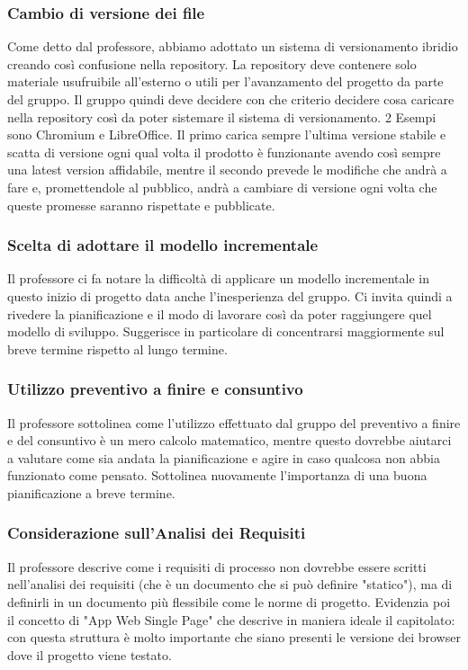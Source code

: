 \subsubsection{Cambio di versione dei file}
Come detto dal professore, abbiamo adottato un sistema di versionamento ibridio creando così confusione nella repository. La repository deve contenere solo materiale usufruibile all'esterno o utili per l'avanzamento del progetto da parte del gruppo. Il gruppo quindi deve decidere con che criterio decidere cosa caricare nella repository così da poter sistemare il sistema di versionamento.
2 Esempi sono Chromium e LibreOffice. Il primo carica sempre l'ultima versione stabile e scatta di versione ogni qual volta il prodotto è funzionante avendo così sempre una latest version affidabile, mentre il secondo prevede le modifiche che andrà a fare e, promettendole al pubblico, andrà a cambiare di versione ogni volta che queste promesse saranno rispettate e pubblicate.

\subsubsection{Scelta di adottare il modello incrementale}
Il professore ci fa notare la difficoltà di applicare un modello incrementale in questo inizio di progetto data anche l'inesperienza del gruppo. Ci invita quindi a rivedere la pianificazione e il modo di lavorare così da poter raggiungere quel modello di sviluppo. Suggerisce in particolare di concentrarsi maggiormente sul breve termine rispetto al lungo termine.

\subsubsection{Utilizzo preventivo a finire e consuntivo}
Il professore sottolinea come l'utilizzo effettuato dal gruppo del preventivo a finire e del consuntivo è un mero calcolo matematico, mentre questo dovrebbe aiutarci a valutare come sia andata la pianificazione e agire in caso qualcosa non abbia funzionato come pensato. Sottolinea nuovamente l'importanza di una buona pianificazione a breve termine.

\subsubsection{Considerazione sull'Analisi dei Requisiti}
Il professore descrive come i requisiti di processo non dovrebbe essere scritti nell'analisi dei requisiti (che è un documento che si può definire "statico"), ma di definirli in un documento più flessibile come le norme di progetto. Evidenzia poi il concetto di "App Web Single Page" che descrive in maniera ideale il capitolato: con questa struttura è molto importante che siano presenti le versione dei browser dove il progetto viene testato.

